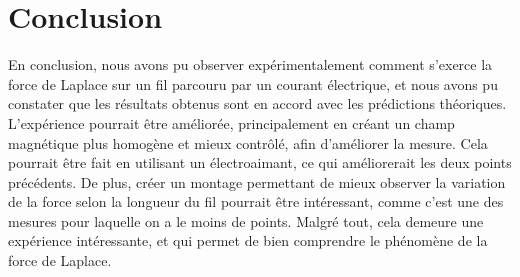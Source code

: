 \documentclass[11pt]{article}
\begin{document}
    \section{Conclusion}\label{sec:conclusion}

    En conclusion, nous avons pu observer expérimentalement comment s'exerce la force de Laplace sur un fil
    parcouru par un courant électrique, et nous avons pu constater que les résultats obtenus sont en accord
    avec les prédictions théoriques.
    L'expérience pourrait être améliorée, principalement en créant un champ magnétique plus homogène et
    mieux contrôlé, afin d'améliorer la mesure.
    Cela pourrait être fait en utilisant un électroaimant, ce qui améliorerait les deux points précédents.
    De plus, créer un montage permettant de mieux observer la variation de la force selon la longueur du fil
    pourrait être intéressant, comme c'est une des mesures pour laquelle on a le moins de points.
    Malgré tout, cela demeure une expérience intéressante, et qui permet de bien comprendre le phénomène
    de la force de Laplace.
\end{document}
